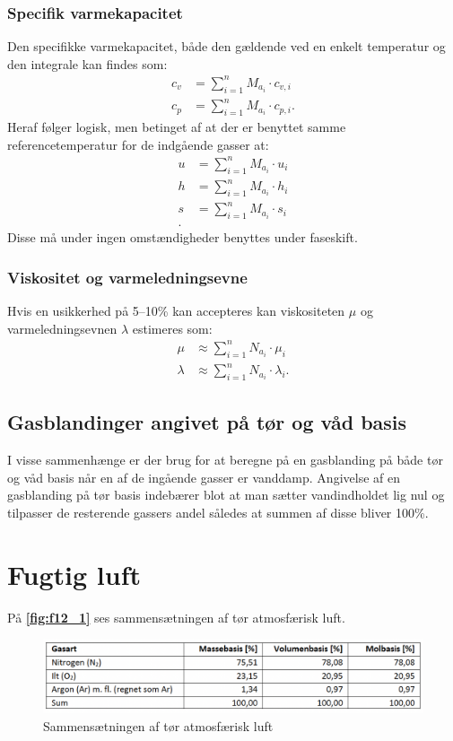 \subsubsection{Specifik varmekapacitet}
Den specifikke varmekapacitet, både den gældende ved en enkelt temperatur og den integrale kan findes som:
\begin{align*}
  c_v &= \sum_{i = 1}^{n} M_{a_i} \cdot c_{v,i} \\
  c_p &= \sum_{i = 1}^{n} M_{a_i} \cdot c_{p,i}
.\end{align*}
Heraf følger logisk, men betinget af at der er benyttet samme referencetemperatur for de indgående gasser at:
\begin{align*}
  u &= \sum_{i = 1}^{n} M_{a_i} \cdot u_i \\
  h &= \sum_{i = 1}^{n} M_{a_i}\cdot h_i \\
  s &= \sum_{i = 1}^{n} M_{a_i} \cdot s_i \\
.\end{align*}
Disse må under ingen omstændigheder benyttes under faseskift.

\subsubsection{Viskositet og varmeledningsevne}
Hvis en usikkerhed på 5--10\% kan accepteres kan viskositeten $\mu$ og varmeledningsevnen $\lambda$ estimeres som:
\begin{align*}
  \mu &\approx \sum_{i = 1}^{n} N_{a_i} \cdot \mu_i \\
  \lambda &\approx \sum_{i = 1}^{n} N_{a_i} \cdot \lambda_i
.\end{align*}

\subsection{Gasblandinger angivet på tør og våd basis}
I visse sammenhænge er der brug for at beregne på en gasblanding på både tør og våd basis når en af de ingående gasser er vanddamp. Angivelse af en gasblanding på tør basis indebærer blot at man sætter vandindholdet lig nul og tilpasser de resterende gassers andel således at summen af disse bliver 100\%.


\section{Fugtig luft}
På \textbf{\autoref{fig:f12_1}} ses sammensætningen af tør atmosfærisk luft.
\begin{figure} [ht]
  \centering
  \includegraphics[width=0.75\linewidth]{./figures/f12_1.png}
  \caption{Sammensætningen af tør atmosfærisk luft}
  \label{fig:f12_1}
\end{figure}

